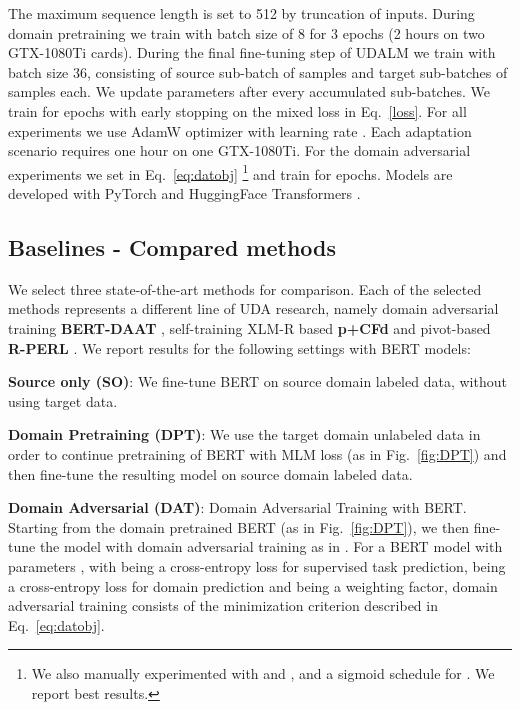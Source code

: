 \documentclass[11pt]{article}
\begin{document}
The maximum sequence length is set to 512 by truncation of inputs. During domain pretraining we train with batch size of 8 for 3 epochs (2 hours on two GTX-1080Ti cards).   
During the final fine-tuning step of UDALM we train with batch size 36, consisting of  source sub-batch of  samples and  target sub-batches of  samples each.
We update parameters after every  accumulated sub-batches. We train for  epochs with early stopping on the mixed loss in Eq.~\ref{loss}. 
For all experiments we use AdamW optimizer \cite{loshchilov2018decoupled} with learning rate .
Each adaptation scenario requires one hour on one GTX-1080Ti.
For the domain adversarial experiments we set   in Eq.~\ref{eq:datobj} \footnote{We also manually experimented with  and , and a sigmoid schedule for . We report best results.} and train for  epochs.
Models are developed with PyTorch \citep{pytorch} and HuggingFace Transformers \citep{wolf2019huggingface}.

\subsection{Baselines - Compared methods}

We select three state-of-the-art methods for comparison. Each of the selected methods represents a different line of UDA research, namely domain adversarial training \textbf{BERT-DAAT} \citep{du-etal-2020-adversarial}, self-training XLM-R based \textbf{p+CFd} \citep{ye_feature_2020} and pivot-based \textbf{R-PERL} \citep{ben2020perl}.
We report results for the following settings with BERT models:


\noindent \textbf{Source only (SO)}: We fine-tune BERT on source domain labeled data, without using target data. 


\noindent \textbf{Domain Pretraining (DPT)}: We use the target domain unlabeled data in order to continue pretraining of BERT with MLM loss (as in Fig.~\ref{fig:DPT}) and then fine-tune the resulting model on source domain labeled data.


\noindent \textbf{Domain Adversarial (DAT)}: Domain Adversarial Training with BERT. Starting from the domain pretrained BERT (as in Fig.~\ref{fig:DPT}), we then fine-tune the model with domain adversarial training as in \citet{ganin2016domain}. 
For a BERT model with parameters , with  being a cross-entropy loss for supervised task prediction,  being a cross-entropy loss for domain prediction and  being a weighting factor, domain adversarial training consists of the minimization criterion described in Eq.~\ref{eq:datobj}.
\vspace*{-1mm}
\end{document}
